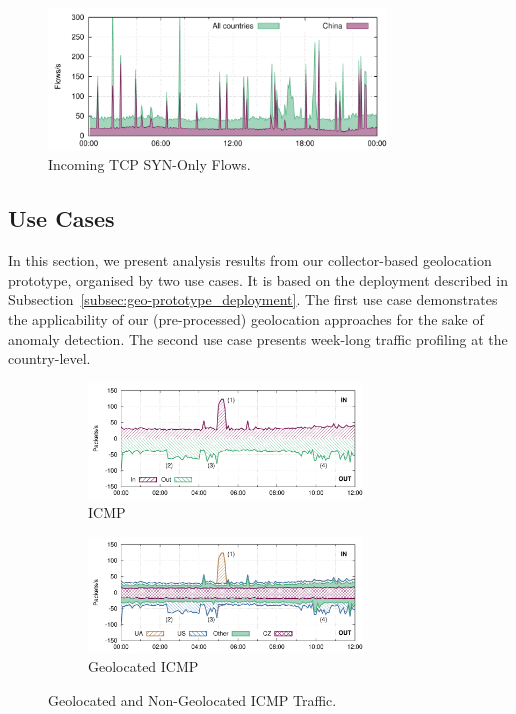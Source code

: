 \begin{figure}[!tb]
    \centering
    \includegraphics[width=0.8\textwidth]{figures/paper-geolocation/ctry-cn-tw/flows}
    \caption{Incoming TCP SYN-Only Flows.}
    \label{fig:geo-tcp-syn}
\end{figure}

\subsection{Use Cases} \label{subsec:geo-use_cases}

In this section, we present analysis results from our collector-based geolocation prototype, organised by two use cases. It is based on the deployment described in Subsection~\ref{subsec:geo-prototype_deployment}. The first use case demonstrates the applicability of our (pre-processed) geolocation approaches for the sake of anomaly detection. The second use case presents week-long traffic profiling at the country-level.

\begin{figure}[!tb]
    \begin{subfigure}[t]{\textwidth}
        \centering
        \includegraphics[width=0.8\textwidth]{figures/paper-geolocation/icmp/packets}
        \caption{ICMP}
        \label{fig:geo-icmp-traffic}
    \end{subfigure}%
    \hfill
    \begin{subfigure}[t]{\textwidth}
        \centering
        \includegraphics[width=0.8\textwidth]{figures/paper-geolocation/icmp-geo/packets}
        \caption{Geolocated ICMP}
        \label{fig:geo-icmp-geo-traffic}
    \end{subfigure}
    \caption{Geolocated and Non-Geolocated ICMP Traffic.}
    \label{fig:geo-icmp}
\end{figure}


